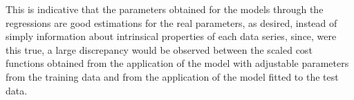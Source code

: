 This is indicative that the parameters obtained for the models through the
regressions are good estimations for the real parameters, as desired, instead of
simply information about intrinsical properties of each data series, since, were
this true, a large discrepancy would be observed between the scaled cost functions
obtained from the application of the model with adjustable parameters from the
training data and from the application of the model fitted to the test data.


